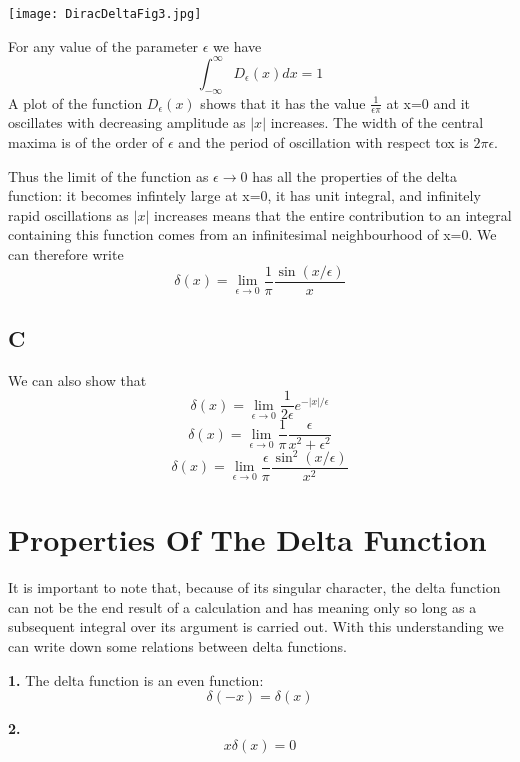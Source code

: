 \vspace{0.2cm}
\begin{center}
\texttt{[image: DiracDeltaFig3.jpg]}
\end{center}

For any value of the parameter $\epsilon$ we have 
\begin{equation}
\int_{-\infty}^{\infty} D_\epsilon (x) dx = 1
\end{equation}
A plot of the function $D_{\epsilon} (x)$ shows that it has the value $\frac{1}{\epsilon \pi}$ at x=0 and it oscillates with decreasing amplitude as $|x|$ increases. The width of the central maxima is of the order of $\epsilon$ and the period of oscillation with respect tox is $2\pi \epsilon$.

Thus the limit of the function as $\epsilon \to 0$ has all the properties of the delta function: it becomes infintely large at x=0, it has unit integral, and infinitely rapid oscillations as $|x|$ increases means that the entire contribution to an integral containing this function comes from an infinitesimal neighbourhood of x=0. We can therefore write 
\begin{equation}
\delta (x) = \lim_{\epsilon \to 0} \frac{1}{\pi} \frac{\sin (x/\epsilon)}{x}
\end{equation}

\subsection*{C}
We can also show that $$\delta (x) = \lim_{\epsilon \to 0} \frac{1}{2\epsilon} e^{-|x|/\epsilon}$$  $$\delta (x) = \lim_{\epsilon \to 0} \frac{1}{\pi} \frac{\epsilon}{x^2 + \epsilon^2}$$  $$\delta (x) = \lim_{\epsilon \to 0} \frac{\epsilon}{\pi} \frac{\sin^2 (x/\epsilon)}{x^2}$$


\section*{Properties Of The Delta Function}
It is important  to note that, because of its singular character, the delta function can not be the end result of a calculation and has meaning only so long as a subsequent integral over its argument is carried out. With this understanding we can write down some relations between delta functions.

\textbf{1.} The delta function is an even function: $$
\delta(-x) = \delta(x)$$

\textbf{2.} $$x \delta(x) = 0$$

